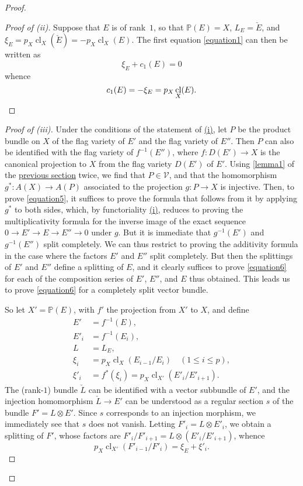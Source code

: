 \documentclass{article}
\theoremstyle{plain}
\theoremstyle{definition}
\newcommand{\cat}{\mathcal}
\renewcommand{\leq}{\leqslant}
\DeclareMathOperator{\cl}{cl}
\begin{document}
\begin{proof}
  \begin{proof}[Proof of \rm{(ii)}]
    Suppose that $E$ is of rank~$1$, so that $\mathbb{P}(E)=X$, $L_E=\check{E}$, and $\xi_E = p_X\cl_X(\check{E}) = -p_X\cl_X(E)$.
    The first equation \cref{equation1} can then be written as
    \[
      \xi_E + c_1(E) = 0
    \]
    whence
    \[
      c_1(E) = -\xi_E = p_X\cl_X(E).\qedhere
    \]
  \end{proof}

  \begin{proof}[Proof of \rm{(iii)}]
    Under the conditions of the statement of \hyperref[theorem1i]{(i)}, let $P$ be the product bundle on $X$ of the flag variety of $E'$ and the flag variety of $E''$.
    Then $P$ can also be identified with the flag variety of $f^{-1}(E'')$, where $f\colon D(E')\to X$ is the canonical projection to $X$ from the flag variety $D(E')$ of $E'$.
    Using \cref{lemma1} of the \hyperref[section2]{previous section} twice, we find that $P\in\cat{V}$, and that the homomorphism $g^*\colon A(X)\to A(P)$ associated to the projection $g\colon P\to X$ is injective.
    Then, to prove \cref{equation5}, it suffices to prove the formula that follows from it by applying $g^*$ to both sides, which, by functoriality \hyperref[theorem1i]{(i)}, reduces to proving the multiplicativity formula for the inverse image of the exact sequence $0\to E'\to E\to E''\to 0$ under $g$.
    But it is immediate that $g^{-1}(E')$ and $g^{-1}(E'')$ split completely.
    We can thus restrict to proving the additivity formula in the case where the factors $E'$ and $E''$ split completely.
    But then the splittings of $E'$ and $E''$ define a splitting of $E$, and it clearly suffices to prove \cref{equation6} for each of the composition series of $E'$, $E''$, and $E$ thus obtained.
    This leads us to prove \cref{equation6} for a completely split vector bundle.

    So let $X'=\mathbb{P}(E)$, with $f'$ the projection from $X'$ to $X$, and define
    \[
      \begin{aligned}
        E' &= f^{-1}(E),
      \\E'_i &= f^{-1}(E_i),
      \\L &= L_E,
      \\\xi_i &= p_X\cl_X(E_{i-1}/E_i)\quad(1\leq i\leq p),
      \\\xi'_i &= f^*(\xi_i) = p_X\cl_{X'}(E'_i/E'_{i+1}).
      \end{aligned}
    \]
    The (rank-$1$) bundle $\check{L}$ can be identified with a vector subbundle of $E'$, and the injection homomorphism $\check{L}\to E'$ can be understood as a regular section $s$ of the bundle $F'=L\otimes E'$.
    Since $s$ corresponds to an injection morphism, we immediately see that $s$ does not vanish.
    Letting $F'_i=L\otimes E'_i$, we obtain a splitting of $F'$, whose factors are $F'_i/F'_{i+1} = L\otimes(E'_i/E'_{i+1})$, whence
    \[
      p_X\cl_{X'}(F'_{i-1}/F'_{i}) = \xi_E+\xi'_i.
    \]


\end{proof}
\end{proof}
\end{document}
